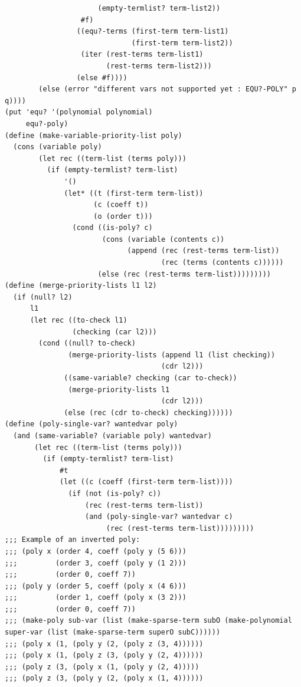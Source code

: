 \documentclass[final,fleqn,titlepage,twoside]{article}
\begin{document}
\begin{verbatim}
                      (empty-termlist? term-list2))
                  #f)
                 ((equ?-terms (first-term term-list1)
                              (first-term term-list2))
                  (iter (rest-terms term-list1)
                        (rest-terms term-list2)))
                 (else #f))))
        (else (error "different vars not supported yet : EQU?-POLY" p q))))
(put 'equ? '(polynomial polynomial)
     equ?-poly)
(define (make-variable-priority-list poly)
  (cons (variable poly)
        (let rec ((term-list (terms poly)))
          (if (empty-termlist? term-list)
              '()
              (let* ((t (first-term term-list))
                     (c (coeff t))
                     (o (order t)))
                (cond ((is-poly? c)
                       (cons (variable (contents c))
                             (append (rec (rest-terms term-list))
                                     (rec (terms (contents c))))))
                      (else (rec (rest-terms term-list)))))))))
(define (merge-priority-lists l1 l2)
  (if (null? l2)
      l1
      (let rec ((to-check l1)
                (checking (car l2)))
        (cond ((null? to-check)
               (merge-priority-lists (append l1 (list checking))
                                     (cdr l2)))
              ((same-variable? checking (car to-check))
               (merge-priority-lists l1
                                     (cdr l2)))
              (else (rec (cdr to-check) checking))))))
(define (poly-single-var? wantedvar poly)
  (and (same-variable? (variable poly) wantedvar)
       (let rec ((term-list (terms poly)))
         (if (empty-termlist? term-list)
             #t
             (let ((c (coeff (first-term term-list))))
               (if (not (is-poly? c))
                   (rec (rest-terms term-list))
                   (and (poly-single-var? wantedvar c)
                        (rec (rest-terms term-list)))))))))
;;; Example of an inverted poly:
;;; (poly x (order 4, coeff (poly y (5 6)))
;;;         (order 3, coeff (poly y (1 2)))
;;;         (order 0, coeff 7))
;;; (poly y (order 5, coeff (poly x (4 6)))
;;;         (order 1, coeff (poly x (3 2)))
;;;         (order 0, coeff 7))
;;; (make-poly sub-var (list (make-sparse-term subO (make-polynomial super-var (list (make-sparse-term superO subC))))))
;;; (poly x (1, (poly y (2, (poly z (3, 4))))))
;;; (poly x (1, (poly z (3, (poly y (2, 4))))))
;;; (poly z (3, (poly x (1, (poly y (2, 4)))))
;;; (poly z (3, (poly y (2, (poly x (1, 4))))))


\end{verbatim}
\end{document}
